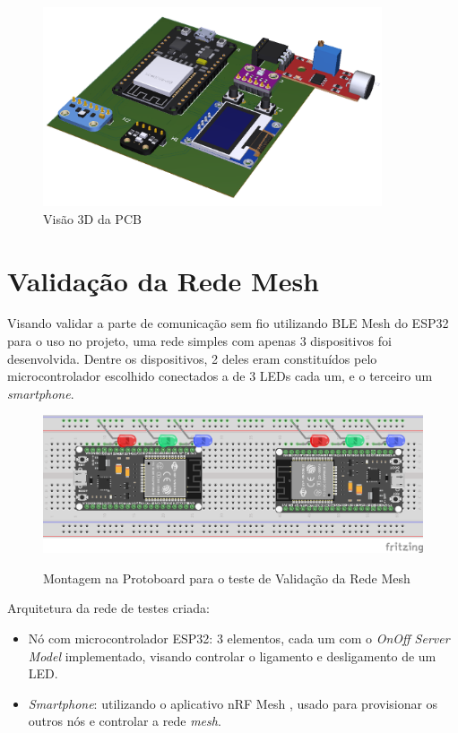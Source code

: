 \documentclass[../monografia.tex]{subfiles}
\begin{document}
\begin{figure}[h!]
\centering
\includegraphics[width=10cm]{pcb}
\caption{Visão 3D da PCB}
\label{fig:img4}
\end{figure}

\section{Validação da Rede Mesh}

Visando validar a parte de comunicação sem fio utilizando BLE Mesh do ESP32 para o uso no projeto, uma rede simples com apenas 3 dispositivos foi desenvolvida. Dentre os dispositivos, 2 deles eram constituídos pelo microcontrolador escolhido conectados a de 3 LEDs cada um, e o terceiro um \textit{smartphone}. 

\begin{figure}[h]
	\centering
		\includegraphics[width=.8\textwidth]{mesh_test}
		\label{fig:test}
		\caption{Montagem na Protoboard para o teste de Validação da Rede Mesh}
\end{figure}

Arquitetura da rede de testes criada:

\begin{itemize}
	\item Nó com microcontrolador ESP32: 3 elementos, cada um com o \textit{OnOff Server Model} \cite{ble-mesh-models} implementado, visando controlar o ligamento e desligamento de um LED.
	\item \textit{Smartphone}: utilizando o aplicativo nRF Mesh \cite{nrf-app}, usado para provisionar os outros nós e controlar a rede \textit{mesh}.
\end{itemize}
\end{document}
